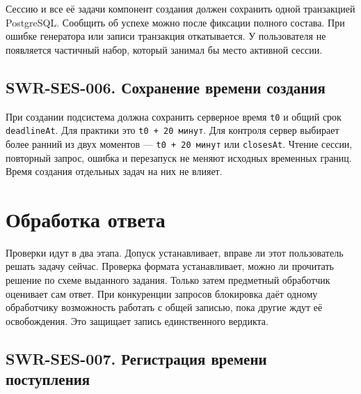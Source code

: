 \documentclass[12pt,a4paper]{article}
\begin{document}
\hypertarget{swr-ses-005-сохранение-созданного-набора}{}

\hypertarget{swr-ses-005}{}

Сессию и все её задачи компонент создания должен сохранить одной транзакцией PostgreSQL. Сообщить об успехе можно после фиксации полного состава. При ошибке генератора или записи транзакция откатывается. У пользователя не появляется частичный набор, который занимал бы место активной сессии.

\subsection{SWR-SES-006. Сохранение времени создания}\label{swr-ses-006-ux441ux43eux445ux440ux430ux43dux435ux43dux438ux435-ux432ux440ux435ux43cux435ux43dux438-ux441ux43eux437ux434ux430ux43dux438ux44f}

\hypertarget{swr-ses-006-сохранение-времени-создания}{}

\hypertarget{swr-ses-006}{}

При создании подсистема должна сохранить серверное время \texttt{t0} и общий срок \texttt{deadlineAt}. Для практики это \texttt{t0\ +\ 20\ минут}. Для контроля сервер выбирает более ранний из двух моментов --- \texttt{t0\ +\ 20\ минут} или \texttt{closesAt}. Чтение сессии, повторный запрос, ошибка и перезапуск не меняют исходных временных границ. Время создания отдельных задач на них не влияет.

\section{Обработка ответа}\label{3-ux43eux431ux440ux430ux431ux43eux442ux43aux430-ux43eux442ux432ux435ux442ux430}

\hypertarget{3-обработка-ответа}{}

Проверки идут в два этапа. Допуск устанавливает, вправе ли этот пользователь решать задачу сейчас. Проверка формата устанавливает, можно ли прочитать решение по схеме выданного задания. Только затем предметный обработчик оценивает сам ответ. При конкуренции запросов блокировка даёт одному обработчику возможность работать с общей записью, пока другие ждут её освобождения. Это защищает запись единственного вердикта.

\subsection{SWR-SES-007. Регистрация времени поступления}\label{swr-ses-007-ux440ux435ux433ux438ux441ux442ux440ux430ux446ux438ux44f-ux432ux440ux435ux43cux435ux43dux438-ux43fux43eux441ux442ux443ux43fux43bux435ux43dux438ux44f}
\end{document}
